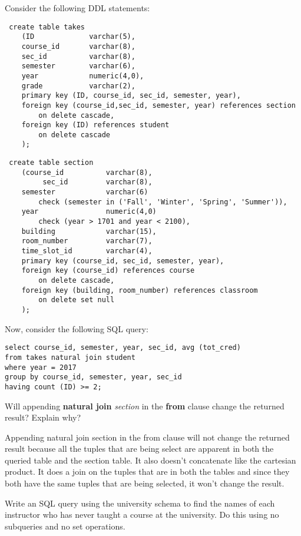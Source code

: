 \documentclass[a4 paper]{article}
\begin{document}
Consider the following DDL statements:
\begin{verbatim}
 create table takes
    (ID             varchar(5), 
    course_id       varchar(8),
    sec_id          varchar(8), 
    semester        varchar(6),
    year            numeric(4,0),
    grade           varchar(2),
    primary key (ID, course_id, sec_id, semester, year),
    foreign key (course_id,sec_id, semester, year) references section
        on delete cascade,
    foreign key (ID) references student
        on delete cascade
    );
\end{verbatim}
\begin{verbatim}
 create table section
    (course_id          varchar(8), 
         sec_id         varchar(8),
    semester            varchar(6)
        check (semester in ('Fall', 'Winter', 'Spring', 'Summer')), 
    year                numeric(4,0) 
        check (year > 1701 and year < 2100), 
    building            varchar(15),
    room_number         varchar(7),
    time_slot_id        varchar(4),
    primary key (course_id, sec_id, semester, year),
    foreign key (course_id) references course
        on delete cascade,
    foreign key (building, room_number) references classroom
        on delete set null
    );
\end{verbatim}

\noindent Now, consider the following SQL query:
\begin{verbatim}
select course_id, semester, year, sec_id, avg (tot_cred)
from takes natural join student
where year = 2017
group by course_id, semester, year, sec_id
having count (ID) >= 2;
\end{verbatim}

\noindent Will appending \textbf{natural join} \emph{section} in the \textbf{from} clause change the returned result? Explain why?

Appending natural join section in the from clause will not change the returned result because all the tuples that are being select are apparent in both the queried table and the section table.
It also doesn't concatenate like the cartesian product. It does a join on the tuples that are in both the tables and since they both have the same tuples that are being selected, it won't change the result.

Write an SQL query using the university schema to find the names of each instructor who has never taught a course at the university. Do this using no subqueries and no set operations.
\end{document}
